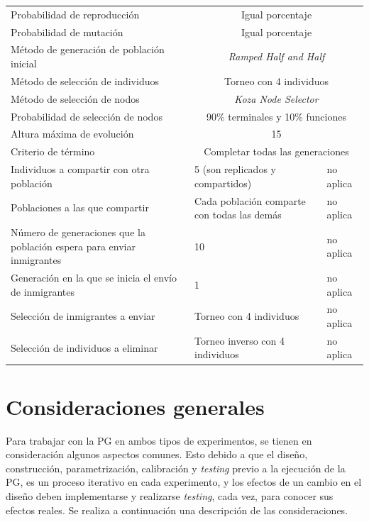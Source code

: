 \begin{table}[H]
\begin{tabular}{p{}p{}p{}}
Probabilidad de reproducción                                            &  \multicolumn{2}{c}{Igual porcentaje} \\
Probabilidad de mutación                                                &  \multicolumn{2}{c}{Igual porcentaje} \\
Método de generación de población inicial                               &  \multicolumn{2}{c}{\textit{Ramped Half and Half}} \\
Método de selección de individuos                                       &  \multicolumn{2}{c}{Torneo con 4 individuos} \\
Método de selección de nodos                                            &  \multicolumn{2}{c}{\textit{Koza Node Selector}} \\
Probabilidad de selección de nodos                                      &  \multicolumn{2}{c}{90\% terminales y 10\% funciones} \\
Altura máxima de evolución                                              &  \multicolumn{2}{c}{15} \\
Criterio de término                                                     &  \multicolumn{2}{c}{Completar todas las generaciones} \\
Individuos a compartir con otra población                               &  5 (son replicados y compartidos)      & no aplica \\
Poblaciones a las que compartir                                         &  Cada población comparte con todas las demás & no aplica \\
Número de generaciones que la población espera para enviar inmigrantes  &  10                                    & no aplica  \\
Generación en la que se inicia el envío de inmigrantes                  &  1                                     & no aplica  \\
Selección de inmigrantes a enviar                                       &  Torneo con 4 individuos               & no aplica  \\
Selección de individuos a eliminar                                      &  Torneo inverso con 4 individuos & no aplica  \\\hline
\end{tabular}
\end{table}

\section{Consideraciones generales}\label{cap:consideraciones}
Para trabajar con la PG en ambos tipos de experimentos, se tienen en consideración algunos aspectos comunes. Esto debido a que el diseño, construcción, parametrización, calibración y \textit{testing} previo a la ejecución de la PG, es un proceso iterativo en cada experimento, y los efectos de un cambio en el diseño deben implementarse y realizarse \textit{testing}, cada vez, para conocer sus efectos reales. Se realiza a continuación una descripción de las consideraciones.

